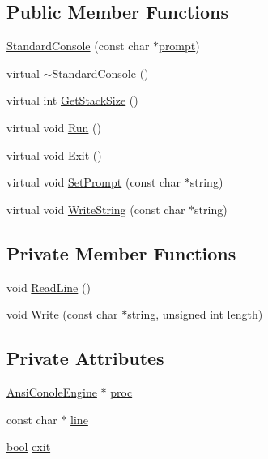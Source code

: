 \subsection*{Public Member Functions}
\begin{DoxyCompactItemize}
\item 
\hyperlink{classStandardConsole_a8b2990d83e98f8c319894246384e71e1}{Standard\+Console} (const char $\ast$\hyperlink{classConsoleBase_ac0b5764a1c339ac271d0c44943e4370c}{prompt})
\item 
virtual \hyperlink{classStandardConsole_abde73c34d62afc7bf1c658817d36299b}{$\sim$\+Standard\+Console} ()
\item 
virtual int \hyperlink{classStandardConsole_af0b69c487667723a1e33357db6132e94}{Get\+Stack\+Size} ()
\item 
virtual void \hyperlink{classStandardConsole_a9380023bba612b816b134589130bb254}{Run} ()
\item 
virtual void \hyperlink{classStandardConsole_a5cd03a0758b89c116b90fee058d612c3}{Exit} ()
\item 
virtual void \hyperlink{classStandardConsole_aa8e28b5271f982514c12bc6c66f310f9}{Set\+Prompt} (const char $\ast$string)
\item 
virtual void \hyperlink{classStandardConsole_a4357667b7d80d110aca730ccb1cdca13}{Write\+String} (const char $\ast$string)
\end{DoxyCompactItemize}
\subsection*{Private Member Functions}
\begin{DoxyCompactItemize}
\item 
void \hyperlink{classStandardConsole_a387d8a0bf9d6ec722868026f58393942}{Read\+Line} ()
\item 
void \hyperlink{classStandardConsole_a43844eb181d640c0e4860ef21c2e8fa7}{Write} (const char $\ast$string, unsigned int length)
\end{DoxyCompactItemize}
\subsection*{Private Attributes}
\begin{DoxyCompactItemize}
\item 
\hyperlink{classAnsiConoleEngine}{Ansi\+Conole\+Engine} $\ast$ \hyperlink{classStandardConsole_a0b6899785e858b50d8b632cc546b347a}{proc}
\item 
const char $\ast$ \hyperlink{classStandardConsole_a2ed234e29cf0056dfdc40bac5f7dd438}{line}
\item 
\hyperlink{platform_8h_a1062901a7428fdd9c7f180f5e01ea056}{bool} \hyperlink{classStandardConsole_a67538cb9ac4d002b2341386fab0b1f13}{exit}
\end{DoxyCompactItemize}
